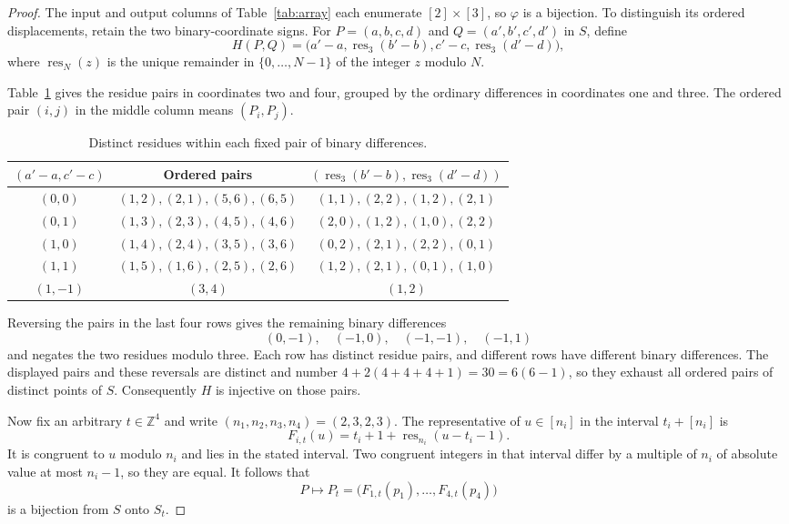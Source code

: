 \documentclass[11pt,a4paper]{article}
\newcommand{\Z}{\mathbb Z}
\newcommand{\res}{\operatorname{res}}
\begin{document}
\begin{proof}
The input and output columns of Table~\ref{tab:array} each enumerate
$[2]\times[3]$, so $\varphi$ is a bijection. To distinguish its ordered
displacements, retain the two binary-coordinate signs. For
$P=(a,b,c,d)$ and $Q=(a',b',c',d')$ in $S$, define
\begin{equation}\label{eq:H}
 H(P,Q)=\bigl(a'-a,\res_3(b'-b),c'-c,\res_3(d'-d)\bigr),
\end{equation}
where $\res_N(z)$ is the unique remainder in $\{0,\ldots,N-1\}$ of
the integer $z$ modulo $N$.

Table~\ref{tab:diff} gives the residue pairs in coordinates two and four,
grouped by the ordinary differences in coordinates one and three.
The ordered pair $(i,j)$ in the middle column means $(P_i,P_j)$.

\begin{table}[ht]
\centering
\small
\setlength{\tabcolsep}{5pt}
\begin{tabular}{ccc}
\toprule
$(a'-a,c'-c)$ & Ordered pairs & $(\res_3(b'-b),\res_3(d'-d))$\\
\midrule
$(0,0)$ & $(1,2),(2,1),(5,6),(6,5)$ & $(1,1),(2,2),(1,2),(2,1)$\\
$(0,1)$ & $(1,3),(2,3),(4,5),(4,6)$ & $(2,0),(1,2),(1,0),(2,2)$\\
$(1,0)$ & $(1,4),(2,4),(3,5),(3,6)$ & $(0,2),(2,1),(2,2),(0,1)$\\
$(1,1)$ & $(1,5),(1,6),(2,5),(2,6)$ & $(1,2),(2,1),(0,1),(1,0)$\\
$(1,-1)$ & $(3,4)$ & $(1,2)$\\
\bottomrule
\end{tabular}
\caption{Distinct residues within each fixed pair of binary differences.}
\label{tab:diff}
\end{table}

Reversing the pairs in the last four rows gives the remaining binary
differences
\[
 (0,-1),\quad(-1,0),\quad(-1,-1),\quad(-1,1)
\]
and negates the two residues
modulo three. Each row has distinct residue pairs, and different rows
have different binary differences. The displayed pairs and these reversals
are distinct and number $4+2(4+4+4+1)=30=6(6-1)$, so they exhaust
all ordered pairs of distinct points of $S$. Consequently $H$ is injective
on those pairs.

Now fix an arbitrary $t\in\Z^4$ and write $(n_1,n_2,n_3,n_4)=(2,3,2,3)$.
The representative of $u\in[n_i]$ in the interval $t_i+[n_i]$ is
\[
 F_{i,t}(u)=t_i+1+\res_{n_i}(u-t_i-1).
\]
It is congruent to $u$ modulo $n_i$ and lies in the stated interval.
Two congruent integers in that interval differ by a multiple of $n_i$
of absolute value at most $n_i-1$, so they are equal. It follows that
\[
 P\longmapsto P_t=\bigl(F_{1,t}(p_1),\ldots,F_{4,t}(p_4)\bigr)
\]
is a bijection from $S$ onto $S_t$.


\end{proof}
\end{document}
